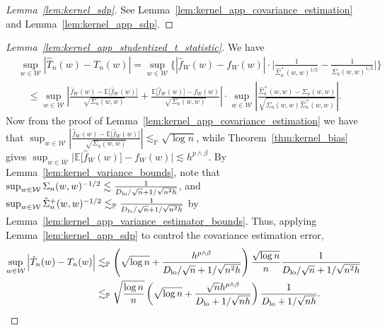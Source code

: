 \documentclass[11pt,lof]{puthesis}
\renewcommand{\P}{\ensuremath{\mathbb{P}}}
\newcommand{\E}{\ensuremath{\mathbb{E}}}
\newcommand{\cW}{\ensuremath{\mathcal{W}}}
\newcommand{\Dl}{\ensuremath{D_{\textup{lo}}}}
\theoremstyle{break}
\theoremstyle{proof}
\newtheorem{proof}{Proof}
\begin{document}
\begin{proof}[Lemma~\ref{lem:kernel_sdp}]
  See Lemma~\ref{lem:kernel_app_covariance_estimation}
  and Lemma~\ref{lem:kernel_app_sdp}.
\end{proof}

\begin{proof}[Lemma~\ref{lem:kernel_app_studentized_t_statistic}]
  We have
  \begin{align*}
    &\sup_{w \in \cW}
    \left| \hat T_n(w) - T_n(w) \right|
    =
    \sup_{w \in \cW}
    \bigg\{
      \left|
        \hat f_W(w) - f_W(w)
      \right|
      \cdot
      \bigg|
      \frac{1}
      {\hat\Sigma_n^+(w,w)^{1/2}}
      -
      \frac{1}{\Sigma_n(w,w)^{1/2}}
      \bigg|
    \bigg\} \\
    &\quad\leq
    \sup_{w \in \cW}
    \left|
      \frac{\hat f_W(w) - \E\big[\hat f_W(w)\big]}
      {\sqrt{\Sigma_n(w,w)}}
      + \frac{\E\big[\hat f_W(w)\big] - f_W(w)}
      {\sqrt{\Sigma_n(w,w)}}
    \right|
    \cdot \sup_{w \in \cW}
    \left|
      \frac{\hat\Sigma_n^+(w,w) - \Sigma_n(w,w)}
      {\sqrt{\Sigma_n(w,w) \hat\Sigma_n^+(w,w)}}
    \right|.
  \end{align*}
  Now from the proof of Lemma~\ref{lem:kernel_app_covariance_estimation} we
  have that
  $\sup_{w \in \cW} \left|
    \frac{\hat f_W(w) - \E\big[\hat f_W(w)\big]}
  {\sqrt{\Sigma_n(w,w)}} \right|
  \lesssim_\P \sqrt{\log n}$,
  while Theorem~\ref{thm:kernel_bias} gives
  $\sup_{w \in \cW} \big| \E\big[\hat f_W(w)\big] - f_W(w) \big|
  \lesssim h^{p \wedge \beta}$.
  By Lemma~\ref{lem:kernel_variance_bounds},
  note that
  $\sup_{w \in \cW} \Sigma_n(w,w)^{-1/2}
  \lesssim \frac{1}{\Dl/\sqrt{n} + 1/\sqrt{n^2h}}$, and
  $\sup_{w \in \cW} \hat \Sigma_n^+(w,w)^{-1/2}
  \lesssim_\P \frac{1}{\Dl/\sqrt{n} + 1/\sqrt{n^2h}}$
  by Lemma~\ref{lem:kernel_app_variance_estimator_bounds}.
  Thus, applying Lemma~\ref{lem:kernel_app_sdp} to control the
  covariance estimation error,
  \begin{align*}
    \sup_{w \in \cW}
    \left| \hat T_n(w) - T_n(w) \right|
    &\lesssim_\P
    \left(
      \sqrt{\log n} + \frac{h^{p \wedge \beta}}{\Dl/\sqrt{n} + 1/\sqrt{n^2h}}
    \right)
    \frac{\sqrt{\log n}}{n}
    \frac{1}{\Dl/\sqrt{n} + 1/\sqrt{n^2h}} \\
    &\lesssim_\P
    \sqrt{\frac{\log n}{n}}
    \left(
      \sqrt{\log n} + \frac{\sqrt n h^{p \wedge \beta}}
      {\Dl + 1/\sqrt{n h}}
    \right)
    \frac{1}{\Dl + 1/\sqrt{n h}}.
  \end{align*}
\end{proof}
\end{document}
